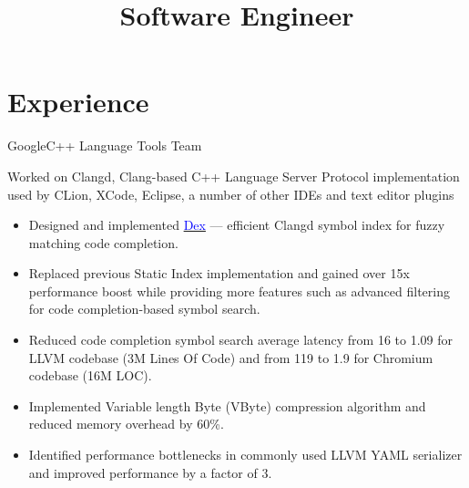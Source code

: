 \documentclass[11pt,a4paper,sans]{moderncv}
\title{Software Engineer}
\begin{document}
\makecvtitle

\section{Experience}
    {Google}{}{C++ Language Tools Team}
    {Worked on Clangd, Clang-based C++ Language Server Protocol implementation
     used by CLion, XCode, Eclipse, a number of other IDEs and text editor
     plugins
     \begin{itemize}
       \item Designed and implemented
         \href{https://docs.google.com/document/d/1C-A6PGT6TynyaX4PXyExNMiGmJ2jL1UwV91Kyx11gOI/edit?usp=sharing}
         {\textcolor{blue}{Dex}} --- efficient Clangd symbol index for fuzzy
         matching code completion.
       \item Replaced previous Static Index implementation and gained over 15x
         performance boost while providing more features such as advanced
         filtering for code completion-based symbol search.
       \item Reduced code completion symbol search average latency from
         \SI{16}{\mics} to \SI{1.09}{\mics} for LLVM codebase (3M Lines Of
         Code) and from \SI{119}{\mics} to \SI{1.9}{\mics} for Chromium
         codebase (16M LOC).
       \item Implemented Variable length Byte (VByte) compression algorithm and
         reduced memory overhead by 60\%.
       \item Identified performance bottlenecks in commonly used LLVM YAML
         serializer and improved performance by a factor of 3.
     \end{itemize}}
\end{document}
